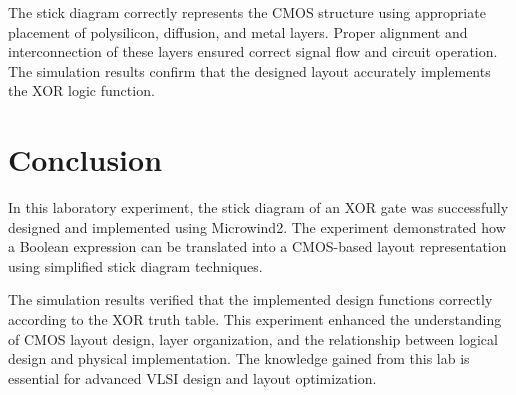 \documentclass[12pt,a4paper]{article}
\begin{document}
The stick diagram correctly represents the CMOS structure using appropriate placement of polysilicon, diffusion, and metal layers. Proper alignment and interconnection of these layers ensured correct signal flow and circuit operation. The simulation results confirm that the designed layout accurately implements the XOR logic function.



\section{Conclusion}
In this laboratory experiment, the stick diagram of an XOR gate was successfully designed and implemented using Microwind2. The experiment demonstrated how a Boolean expression can be translated into a CMOS-based layout representation using simplified stick diagram techniques.

The simulation results verified that the implemented design functions correctly according to the XOR truth table. This experiment enhanced the understanding of CMOS layout design, layer organization, and the relationship between logical design and physical implementation. The knowledge gained from this lab is essential for advanced VLSI design and layout optimization.
\end{document}
